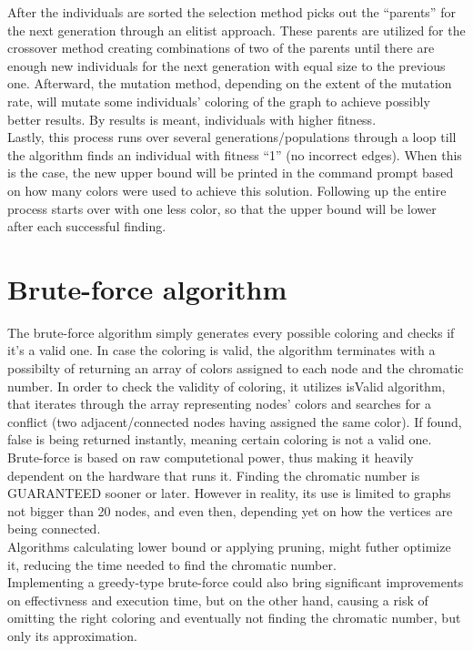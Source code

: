 \documentclass[a4paper]{report}
\begin{document}
		After the individuals are sorted the selection method picks out the “parents” for the next generation through an elitist approach. These parents are utilized for the crossover method creating combinations of two of the parents until there are enough new individuals for the next generation with equal size to the previous one. Afterward, the mutation method, depending on the extent of the mutation rate, will mutate some individuals’ coloring of the graph to achieve possibly better results. By results is meant, individuals with higher fitness.
\\
		
		Lastly, this process runs over several generations/populations through a loop till the algorithm finds an individual with fitness “1” (no incorrect edges). When this is the case, the new upper bound will be printed in the command prompt based on how many colors were used to achieve this solution. Following up the entire process starts over with one less color, so that the upper bound will be lower after each successful finding.
		
		
		\section{Brute-force algorithm}
		The brute-force algorithm simply generates every possible coloring and checks if it's a valid one. In case the coloring is valid, the algorithm terminates with a possibilty of returning an array of colors assigned to each node and the chromatic number. In order to check the validity of coloring, it utilizes isValid algorithm, that iterates through the array representing nodes' colors and searches for a conflict (two adjacent/connected nodes having assigned the same color). If found, false is being returned instantly, meaning certain coloring is not a valid one.\\
		
		Brute-force is based on raw computetional power, thus making it heavily dependent on the hardware that runs it. Finding the chromatic number is GUARANTEED sooner or later. However in reality, its use is limited to graphs not bigger than 20 nodes, and even then, depending yet on how the vertices are being connected.\\
		
		Algorithms calculating lower bound or applying pruning, might futher optimize it, reducing the time needed to find the chromatic number. \\
		
		Implementing a greedy-type brute-force could also bring significant improvements on effectivness and execution time, but on the other hand, causing a risk of omitting the right coloring and eventually not finding the chromatic number, but only its approximation.
		
\end{document}
